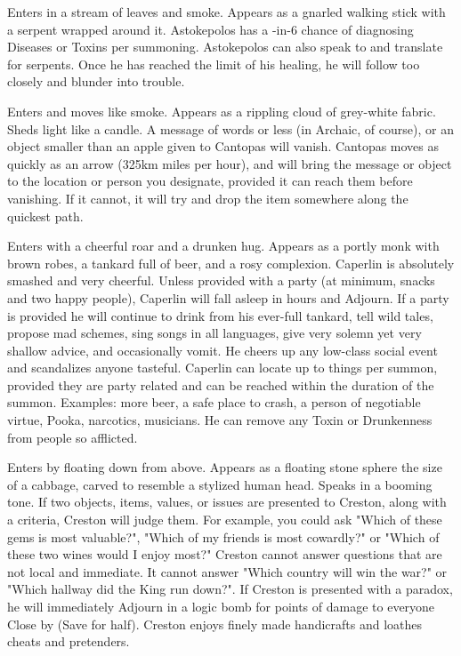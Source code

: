 {
Enters in a stream of leaves and smoke. Appears as a gnarled walking stick with a serpent wrapped around it. Astokepolos has a \DICE-in-6 chance of diagnosing \DICE Diseases or Toxins per summoning.  Astokepolos can also speak to and translate for serpents. Once he has reached the limit of his healing, he will follow too closely and blunder into trouble.


Enters and moves like smoke. Appears as a rippling cloud of grey-white fabric. Sheds light like a candle. A message of \SUMDICE words or less (in Archaic, of course), or an object smaller than an apple given to Cantopas will vanish. Cantopas moves as quickly as an arrow (325km miles per hour), and will bring the message or object to the location or person you designate, provided it can reach them before vanishing. If it cannot, it will try and drop the item somewhere along the quickest path. 



Enters with a cheerful roar and a drunken hug. Appears as a portly monk with brown robes, a tankard full of beer, and a rosy complexion. Caperlin is absolutely smashed and very cheerful. Unless provided with a party (at minimum, snacks and two happy people), Caperlin will fall asleep in \DICE hours and Adjourn. If a party is provided he will continue to drink from his ever-full tankard, tell wild tales, propose mad schemes, sing songs in all languages, give very solemn yet very shallow advice, and occasionally vomit. He cheers up any low-class social event and scandalizes anyone tasteful. Caperlin can locate up to \DICE things per summon, provided they are party related and can be reached within the duration of the summon. Examples: more beer, a safe place to crash, a person of negotiable virtue, Pooka, narcotics, musicians.  He can remove any Toxin or Drunkenness from \DICE people so afflicted.




Enters by floating down from above. Appears as a floating stone sphere the size of a cabbage, carved to resemble a stylized human head. Speaks in a booming tone. If two objects, items, values, or issues are presented to Creston, along with a criteria, Creston will judge them. For example, you could ask "Which of these gems is most valuable?", "Which of my friends is most cowardly?" or "Which of these two wines would I enjoy most?" Creston cannot answer questions that are not local and immediate. It cannot answer "Which country will win the war?" or "Which hallway did the King run down?".  If Creston is presented with a paradox, he will immediately Adjourn in a logic bomb for \SUMDICE points of damage to everyone Close by (Save for half).  Creston enjoys finely made handicrafts and loathes cheats and pretenders. 


}
